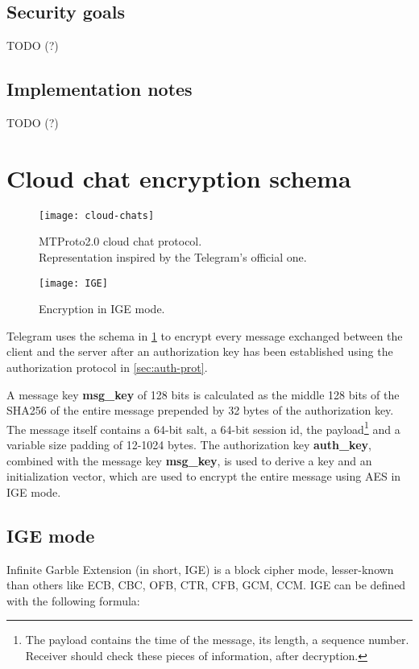 \subsection{Security goals}
TODO (?)

\subsection{Implementation notes}
TODO (?)




\section{Cloud chat encryption schema}
\label{sec:cloud-chat}

\begin{figure}[t]
    \centering
    \texttt{[image: cloud-chats]}
    \caption{MTProto2.0 cloud chat protocol.\\Representation inspired by the Telegram's official one.}
    \label{fig:cloud-chat-protocol}
\end{figure}
\begin{figure}[t]
    \centering
    \texttt{[image: IGE]}
    \caption{Encryption in IGE mode.}
    \label{fig:IGE}
\end{figure}

Telegram uses the schema in \cref{fig:cloud-chat-protocol} to encrypt every message exchanged between the client and the server after an authorization key has been established using the authorization protocol in \cref{sec:auth-prot}.

A message key \textbf{msg\_key} of 128 bits is calculated as the middle 128 bits of the SHA256 of the entire message prepended by 32 bytes of the authorization key. The message itself contains a 64-bit salt, a 64-bit session id, the payload\footnote{The payload contains the time of the message, its length, a sequence number. Receiver should check these pieces of information, after decryption.} and a variable size padding of 12-1024 bytes.
The authorization key \textbf{auth\_key}, combined with the message key \textbf{msg\_key}, is used to derive a key and an initialization vector, which are used to encrypt the entire message using AES in IGE mode.

\subsection{IGE mode}
Infinite Garble Extension (in short, IGE) is a block cipher mode, lesser-known than others like ECB, CBC, OFB, CTR, CFB, GCM, CCM.
IGE can be defined with the following formula:

